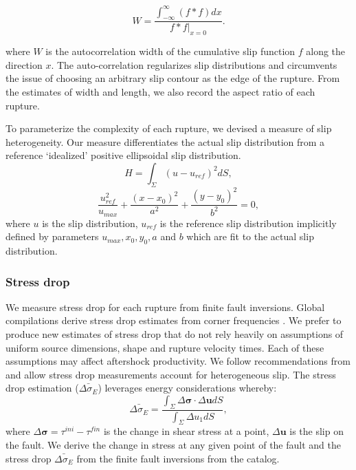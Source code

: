 \documentclass[12pt, notitlepage]{report}
\begin{document}
\begin{equation}
    W = \dfrac{\int_{-\infty}^{\infty} (f*f)dx}{f*f|_{x=0}}.
\end{equation}

where $W$ is the autocorrelation width of the cumulative slip function $f$ along the direction $x$. The auto-correlation regularizes slip distributions and circumvents the issue of choosing an arbitrary slip contour as the edge of the rupture. From the estimates of width and length, we also record the aspect ratio of each rupture.

To parameterize the complexity of each rupture, we devised a measure of slip heterogeneity. Our measure differentiates the actual slip distribution from a reference `idealized' positive ellipsoidal slip distribution.
%
\begin{equation}
    H = \int_\Sigma (u-u_{ref})^2 dS,
\end{equation}
%
\begin{equation}    
    \dfrac{u_{ref}^2}{u_{max}} + \dfrac{(x-x_0)^2}{a^2} +   \dfrac{(y-y_0)^2}{b^2} = 0,
\end{equation}
where $u$ is the slip distribution, $u_{ref}$ is the reference slip distribution implicitly defined by parameters $u_{max}, x_0, y_0, a$ and $b$ which are fit to the actual slip distribution.

\subsubsection{Stress drop}

We measure stress drop for each rupture from finite fault inversions. Global compilations derive stress drop estimates from corner frequencies \cite{Allmann2009GlobalEarthquakes}. We prefer to produce new estimates of stress drop that do not rely heavily on assumptions of uniform source dimensions, shape and rupture velocity times. Each of these assumptions may affect aftershock productivity. We follow recommendations from  \textcite{Noda2013} and allow stress drop measurements account for heterogeneous slip. The stress drop estimation ($\bar{\Delta \sigma_E}$) leverages energy considerations whereby:
\begin{equation}
    \bar{\Delta \sigma_E} = \dfrac{\int_\Sigma \Delta \boldsymbol{\sigma}\cdot \Delta \boldsymbol{u} dS}{\int_\Sigma \Delta u_1 dS},
\end{equation}
where $\Delta \boldsymbol{\sigma} = \tau^{ini}-\tau^{fin}$ is the change in shear stress at a point, $\Delta \boldsymbol{u}$ is the slip on the fault. We derive the change in stress at any given point of the fault and the stress drop $\bar{\Delta \sigma_E}$ from the finite fault inversions from the \textcite{Hayes2017} catalog.
\end{document}
